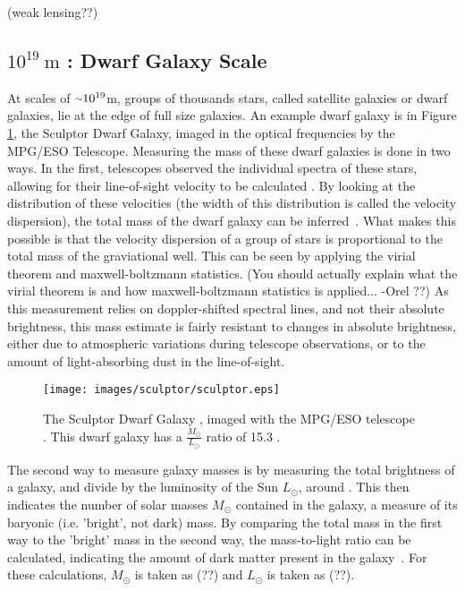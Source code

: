   {\color{red}(weak lensing??)}
  
  \subsection{$10^{19}\:\text{m}$ : Dwarf Galaxy Scale}\label{dm_dwarfscale}
    At scales of $\nicetilde 10^{19}$m, groups of thousands stars, called satellite galaxies or dwarf galaxies, lie at the edge of full size galaxies.
    An example dwarf galaxy is in Figure \ref{fig:sculptor}, the Sculptor Dwarf Galaxy, imaged in the optical frequencies by the MPG/ESO Telescope.
    Measuring the mass of these dwarf galaxies is done in two ways.
    In the first, telescopes observed the individual spectra of these stars, allowing for their line-of-sight velocity to be calculated \cite{dwarf_gal_red_giant}.
    By looking at the distribution of these velocities (the width of this distribution is called the velocity dispersion), the total mass of the dwarf galaxy can be inferred~\cite{dwarf_gal_vel_dispersion, dwarf_gal_vel_dispersion2}.
    What makes this possible is that the velocity dispersion of a group of stars is proportional to the total mass of the graviational well.
    This can be seen by applying the virial theorem and maxwell-boltzmann statistics.
    {\color{red}(You should actually explain what the virial theorem is and how maxwell-boltzmann statistics is applied... -Orel ??)}
    As this measurement relies on doppler-shifted spectral lines, and not their absolute brightness, this mass estimate is fairly resistant to changes in absolute brightness, either due to atmospheric variations during telescope observations, or to the amount of light-absorbing dust in the line-of-sight.

    \begin{figure}[ht]
      \texttt{[image: images/sculptor/sculptor.eps]}
      \caption[Sculptor Dwarf Galaxy]{
        The Sculptor Dwarf Galaxy \cite{sculptor_image}, imaged with the MPG/ESO telescope \cite{sculptor_paper}.
        This dwarf galaxy has a $\frac{M_\odot}{L_\odot}$ ratio of 15.3 \cite{sculptor_ml}.
      }
      \label{fig:sculptor}
    \end{figure}
    
    The second way to measure galaxy masses is by measuring the total brightness of a galaxy, and divide by the luminosity of the Sun $L_\odot$, around .
    This then indicates the number of solar masses $M_\odot$ contained in the galaxy, a measure of its baryonic (i.e. 'bright', not dark) mass.
    By comparing the total mass in the first way to the 'bright' mass in the second way, the mass-to-light ratio can be calculated, indicating the amount of dark matter present in the galaxy~\cite{faber_ml}.
    For these calculations, $M_\odot$ is taken as {\color{red}(??)} and $L_\odot$ is taken as {\color{red}(??)}.
    
